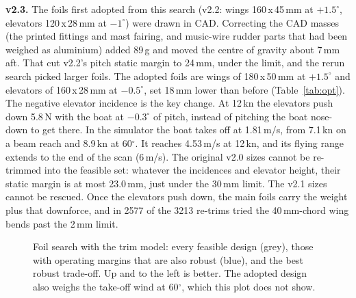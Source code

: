 \documentclass[10pt,twocolumn]{article}
\begin{document}
\noindent\textbf{v2.3.} The foils first adopted from this search (v2.2: wings 160\,x\,45\,mm at $+1.5^\circ$, elevators 120\,x\,28\,mm at $-1^\circ$) were drawn in CAD. Correcting the CAD masses (the printed fittings and mast fairing, and music-wire rudder parts that had been weighed as aluminium) added 89\,g and moved the centre of gravity about 7\,mm aft. That cut v2.2's pitch static margin to 24\,mm, under the limit, and the rerun search picked larger foils. The adopted foils are wings of 180\,x\,50\,mm at $+1.5^\circ$ and elevators of 160\,x\,28\,mm at $-0.5^\circ$, set 18\,mm lower than before (Table~\ref{tab:opt}). The negative elevator incidence is the key change. At 12\,kn the elevators push down 5.8\,N with the boat at $-0.3^\circ$ of pitch, instead of pitching the boat nose-down to get there. In the simulator the boat takes off at 1.81\,m/s, from 7.1\,kn on a beam reach and 8.9\,kn at 60$^\circ$. It reaches 4.53\,m/s at 12\,kn, and its flying range extends to the end of the scan (6\,m/s). The original v2.0 sizes cannot be re-trimmed into the feasible set: whatever the incidences and elevator height, their static margin is at most 23.0\,mm, just under the 30\,mm limit. The v2.1 sizes cannot be rescued. Once the elevators push down, the main foils carry the weight plus that downforce, and in 2577 of the 3213 re-trims tried the 40\,mm-chord wing bends past the 2\,mm limit.

\begin{figure}[t]
\centering
{}
\caption{Foil search with the trim model: every feasible design (grey), those with operating margins that are also robust (blue), and the best robust trade-off. Up and to the left is better. The adopted design also weighs the take-off wind at 60$^\circ$, which this plot does not show.}
\label{fig:opt}
\end{figure}
\end{document}
